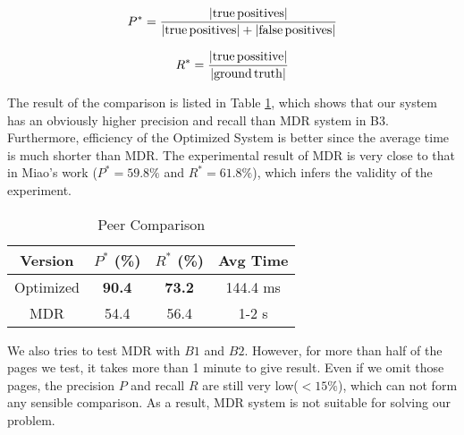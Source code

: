 \begin{equation}
	P^* = \frac{|{\rm true\,positives}|}{|{\rm true\,positives}|+|{\rm false\,positives}|}
\end{equation}

\begin{equation} 
	R^* = \frac{|{\rm true\,possitive}|}{|{\rm ground\,truth}|}
\end{equation}

The result of the comparison is listed in Table \ref{tab:EvalRes2},
which shows that our system has an obviously higher precision and recall than
MDR system in B3. 
Furthermore, efficiency of the Optimized System is better since the average time is much shorter than MDR.
The experimental result of MDR is very close to that in Miao's work\cite{MiaoTHSM09:TagPathClustering}
($P^*=59.8\%$ and $R^*=61.8\%$), which infers the validity of the experiment.

\begin{table}[tb]
\centering
\caption{Peer Comparison}
\label{tab:EvalRes2}
\begin{tabular}{|c||c|c|c|} 
\hline
Version & $P^*$ (\%) & $R^*$ (\%) & Avg Time\\\hline \hline
Optimized & {\bf90.4} & {\bf73.2} & 144.4 ms \\\hline
MDR & 54.4 & 56.4 & 1-2 s \\\hline
\end{tabular}
\end{table}

We also tries to test MDR with $B1$ and $B2$. 
However, for more than half of the pages we test,
it takes more than 1 minute to give result.
Even if we omit those pages, 
the precision $P$ and recall $R$ are still very low($<15\%$),
which can not form any sensible comparison.
As a result, MDR system is not suitable for solving our problem.
